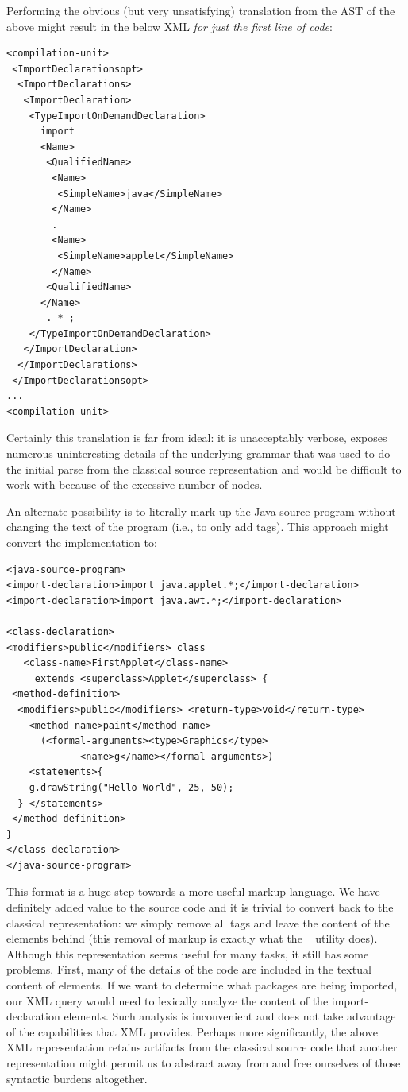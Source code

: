 \documentclass{article}
\begin{document}
Performing the obvious (but very unsatisfying) translation from the AST
of the above might result in the below XML \emph{for just the first line of code}:

\begin{verbatim}
<compilation-unit>
 <ImportDeclarationsopt>
  <ImportDeclarations>
   <ImportDeclaration>
    <TypeImportOnDemandDeclaration>
      import
      <Name>
       <QualifiedName>
        <Name>
         <SimpleName>java</SimpleName>
        </Name>
        .
        <Name>
         <SimpleName>applet</SimpleName>
        </Name>
       <QualifiedName>
      </Name>
       . * ;
    </TypeImportOnDemandDeclaration>
   </ImportDeclaration>
  </ImportDeclarations>
 </ImportDeclarationsopt>
...
<compilation-unit>
\end{verbatim}

Certainly this translation is far from ideal:  it is unacceptably verbose, exposes
numerous uninteresting details of the underlying grammar that was used to do the
initial parse from the classical source representation and would be difficult to work with because
of the excessive number of nodes.

An alternate possibility is to literally mark-up the Java source program
without changing the text of the program (i.e., to only add tags).  This approach might
convert the  implementation to:

\begin{verbatim}
<java-source-program>
<import-declaration>import java.applet.*;</import-declaration>
<import-declaration>import java.awt.*;</import-declaration>

<class-declaration>
<modifiers>public</modifiers> class 
   <class-name>FirstApplet</class-name> 
     extends <superclass>Applet</superclass> {
 <method-definition>
  <modifiers>public</modifiers> <return-type>void</return-type> 
    <method-name>paint</method-name>
      (<formal-arguments><type>Graphics</type> 
             <name>g</name></formal-arguments>) 
    <statements>{
    g.drawString("Hello World", 25, 50);
  } </statements>
 </method-definition>
}
</class-declaration>
</java-source-program>
\end{verbatim}

This format is a huge step towards a more useful markup language.
We have definitely added value to the source code
and it is trivial to convert back to the classical representation: we simply
remove all tags and leave the content of the elements behind (this
removal of markup is
exactly what the ~\cite{perlSGML} utility
does).  Although this representation seems useful for many tasks, it still
has some problems.  First, many of the details of the code are included
in the textual content of elements.  If we want to determine what
packages are being imported, our XML query would need to lexically
analyze the content of the import-declaration elements.  Such analysis is
inconvenient and does not take advantage of the capabilities that XML
provides.  Perhaps more significantly, the above XML representation
retains artifacts from the classical source code that another representation might permit
us to abstract away from and free ourselves of those syntactic burdens
altogether.
\end{document}

